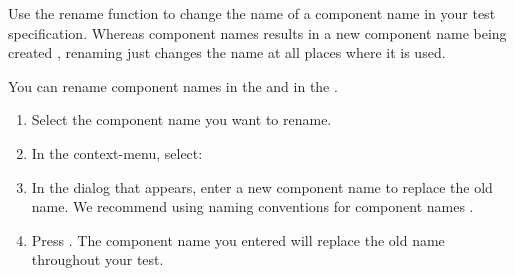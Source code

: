 
Use the rename function to change the name of a component name in your test specification. Whereas  component names results in a new component name being created , renaming just changes the name at all places where it is used. 

You can rename component names in the \gdcompnamebrowser{}  and in the \gdomeditor{}. 
\begin{enumerate}
\item Select the component name you want to rename. 
\item In the context-menu, select:\\
\item In the dialog that appears, enter a new component name to replace the old name. We recommend using naming conventions for component names . 
\item Press . The component name you entered will replace the old name throughout your test. 
\end{enumerate}

